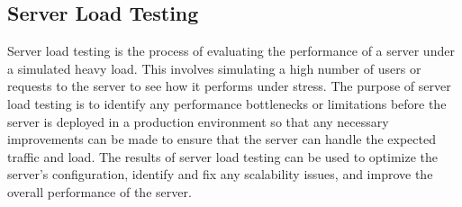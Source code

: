 \documentclass{article}
\begin{document}
        \subsection{Server Load Testing}

        Server load testing is the process of evaluating the performance of a server under a simulated heavy load. This involves simulating a high number of users or requests to the server to see how it performs under stress. The purpose of server load testing is to identify any performance bottlenecks or limitations before the server is deployed in a production environment so that any necessary improvements can be made to ensure that the server can handle the expected traffic and load. The results of server load testing can be used to optimize the server's configuration, identify and fix any scalability issues, and improve the overall performance of the server.


    
    
\end{document}
